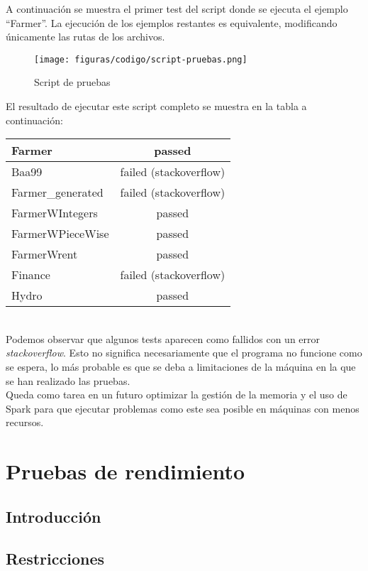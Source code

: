 A continuación se muestra el primer test del script donde se ejecuta el ejemplo ``Farmer''. La ejecución de los ejemplos restantes es equivalente, modificando únicamente las rutas de los archivos.\\

\begin{figure}[H]
    \centerline{\texttt{[image: figuras/codigo/script-pruebas.png]}}
    \caption{Script de pruebas}
\end{figure}

El resultado de ejecutar este script completo se muestra en la tabla a continuación: \\

\begin{tabularx}{\linewidth}{|X|c|}
    \hline
    Farmer & passed \tabularnewline
    \hline
    Baa99 & failed (stackoverflow) \tabularnewline
    \hline
    Farmer\_generated & failed (stackoverflow) \tabularnewline
    \hline
    FarmerWIntegers & passed \tabularnewline
    \hline
    FarmerWPieceWise & passed \tabularnewline
    \hline
    FarmerWrent & passed \tabularnewline
    \hline
    Finance & failed (stackoverflow) \tabularnewline
    \hline
    Hydro & passed \tabularnewline
    \hline
\end{tabularx}
\\ \newline
Podemos observar que algunos tests aparecen como fallidos con un error \textit{stackoverflow}. Esto no significa necesariamente que el programa no funcione como se espera, lo más probable es que se deba a limitaciones de la máquina en la que se han realizado las pruebas.\\

Queda como tarea en un futuro optimizar la gestión de la memoria y el uso de Spark para que ejecutar problemas como este sea posible en máquinas con menos recursos. 

\section{Pruebas de rendimiento}

\subsection{Introducción}

\subsection{Restricciones}

